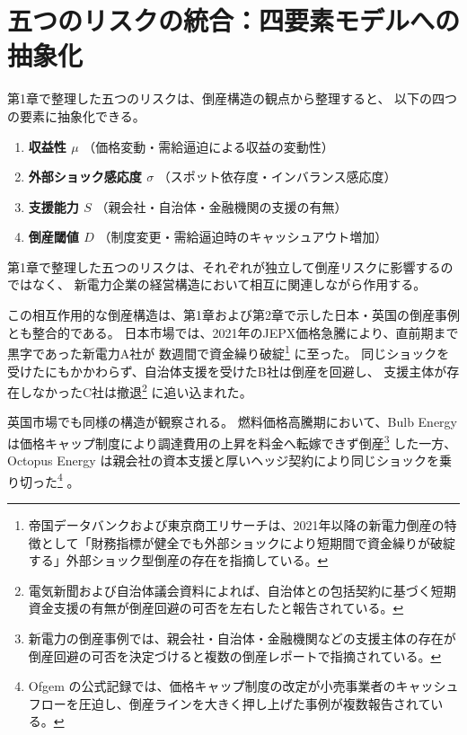 
\section{五つのリスクの統合：四要素モデルへの抽象化}

第1章で整理した五つのリスクは、倒産構造の観点から整理すると、
以下の四つの要素に抽象化できる。

\begin{enumerate}
    \item \textbf{収益性 $\mu$}  
          （価格変動・需給逼迫による収益の変動性）
    \item \textbf{外部ショック感応度 $\sigma$}  
          （スポット依存度・インバランス感応度）
    \item \textbf{支援能力 $S$}  
          （親会社・自治体・金融機関の支援の有無）
    \item \textbf{倒産閾値 $D$}  
          （制度変更・需給逼迫時のキャッシュアウト増加）
\end{enumerate}

第1章で整理した五つのリスクは、それぞれが独立して倒産リスクに影響するのではなく、
新電力企業の経営構造において相互に関連しながら作用する。

この相互作用的な倒産構造は、第1章および第2章で示した日本・英国の倒産事例とも整合的である。
日本市場では、2021年のJEPX価格急騰により、直前期まで黒字であった新電力A社が
数週間で資金繰り破綻\footnote{帝国データバンクおよび東京商工リサーチは、2021年以降の新電力倒産の特徴として「財務指標が健全でも外部ショックにより短期間で資金繰りが破綻する」外部ショック型倒産の存在を指摘している。}
に至った\parencite{TDB2021PowerCrisis,TSR2021PowerCrisis}。
同じショックを受けたにもかかわらず、自治体支援を受けたB社は倒産を回避し、
支援主体が存在しなかったC社は撤退\footnote{電気新聞および自治体議会資料によれば、自治体との包括契約に基づく短期資金支援の有無が倒産回避の可否を左右したと報告されている。}
に追い込まれた\parencite{DenkiShimbun2021Crisis,CityCouncil2021Support}。

英国市場でも同様の構造が観察される。
燃料価格高騰期において、Bulb Energy は価格キャップ制度により調達費用の上昇を料金へ転嫁できず倒産\footnote{新電力の倒産事例では、親会社・自治体・金融機関などの支援主体の存在が倒産回避の可否を決定づけると複数の倒産レポートで指摘されている。}
した一方、
Octopus Energy は親会社の資本支援と厚いヘッジ契約により同じショックを乗り切った\footnote{Ofgem の公式記録では、価格キャップ制度の改定が小売事業者のキャッシュフローを圧迫し、倒産ラインを大きく押し上げた事例が複数報告されている。}
\parencite{Ofgem2021BulbSLR,Ofgem2021OctopusTakeover,UKGov2021BulbSupport}。

